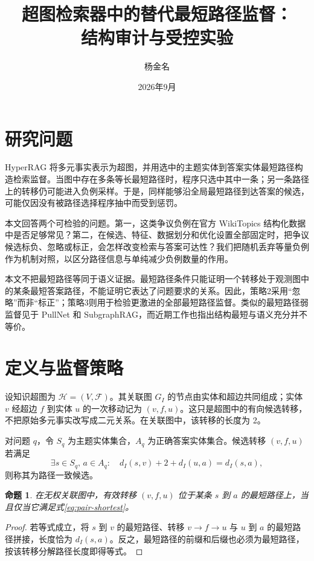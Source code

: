 \documentclass[UTF8,11pt]{ctexart}
\title{超图检索器中的替代最短路径监督：\\
结构审计与受控实验}
\author{杨金名}
\date{2026年9月}
\newtheorem{proposition}{命题}
\begin{document}
\maketitle

\section{研究问题}

HyperRAG 将多元事实表示为超图，并用选中的主题实体到答案实体最短路径构造检索监督\citep{lien2026hyperrag}。当图中存在多条等长最短路径时，程序只选中其中一条；另一条路径上的转移仍可能进入负例采样。于是，同样能够沿全局最短路径到达答案的候选，可能仅因没有被路径选择程序抽中而受到惩罚。

本文回答两个可检验的问题。第一，这类争议负例在官方 WikiTopics 结构化数据中是否足够常见？第二，在候选、特征、数据划分和优化设置全部固定时，把争议候选标负、忽略或标正，会怎样改变检索与答案可达性？我们把随机丢弃等量负例作为机制对照，以区分路径信息与单纯减少负例数量的作用。

本文不把最短路径等同于语义证据。最短路径条件只能证明一个转移处于观测图中的某条最短答案路径，不能证明它表达了问题要求的关系。因此，策略2采用“忽略”而非“标正”；策略3则用于检验更激进的全部最短路径监督。类似的最短路径弱监督见于 PullNet 和 SubgraphRAG\citep{sun2019pullnet,li2025subgraphrag}，而近期工作也指出结构最短与语义充分并不等价\citep{cattaneo2025groundtruth,gao2026pathise}。

\section{定义与监督策略}

设知识超图为 $\mathcal H=(V,\mathcal F)$。其关联图 $G_I$ 的节点由实体和超边共同组成；实体 $v$ 经超边 $f$ 到实体 $u$ 的一次移动记为 $(v,f,u)$。这只是超图中的有向候选转移，不把原始多元事实改写成二元关系。在关联图中，该转移的长度为 2。

对问题 $q$，令 $S_q$ 为主题实体集合，$A_q$ 为正确答案实体集合。候选转移 $(v,f,u)$ 若满足
\begin{equation}
 \exists s\in S_q,\,a\in A_q:\quad
 d_I(s,v)+2+d_I(u,a)=d_I(s,a),
 \label{eq:pair-shortest}
\end{equation}
则称其为路径一致候选。

\begin{proposition}
在无权关联图中，有效转移 $(v,f,u)$ 位于某条 $s$ 到 $a$ 的最短路径上，当且仅当它满足式\eqref{eq:pair-shortest}。
\end{proposition}
\begin{proof}
若等式成立，将 $s$ 到 $v$ 的最短路径、转移 $v\rightarrow f\rightarrow u$ 与 $u$ 到 $a$ 的最短路径拼接，长度恰为 $d_I(s,a)$。反之，最短路径的前缀和后缀也必须为最短路径，按该转移分解路径长度即得等式。
\end{proof}
\end{document}
